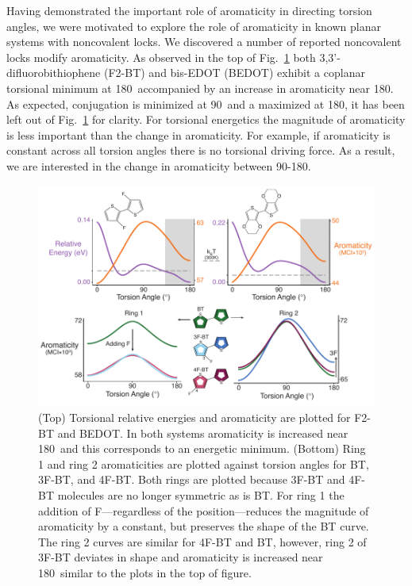 Having demonstrated the important role of aromaticity in directing torsion angles, we were motivated to explore the role of aromaticity in known planar systems with noncovalent locks. We discovered a number of reported noncovalent locks modify aromaticity. As observed in the top of Fig.~\ref{fig:a_mod} both  3,3'-difluorobithiophene (F2-BT) and bis-EDOT (BEDOT) exhibit a coplanar torsional minimum at 180\textdegree \ accompanied by an increase in aromaticity near 180\textdegree. As expected, conjugation is minimized at 90\textdegree \ and a maximized at 180\textdegree, it has been left out of Fig.~\ref{fig:a_mod} for clarity. For torsional energetics the magnitude of aromaticity is less important than the change in aromaticity. For example, if aromaticity is constant across all torsion angles there is no torsional driving force. As a result, we are interested in the change in aromaticity between 90-180\textdegree.

\begin{figure}[hbt!]
    \centering
    \includegraphics{figures/chap3/fig2_d7.pdf}
    \caption{(Top) Torsional relative energies and aromaticity are plotted for F2-BT and BEDOT. In both systems aromaticity is increased near 180\textdegree \ and this corresponds to an energetic minimum. (Bottom) Ring 1 and ring 2 aromaticities are plotted against torsion angles for BT, 3F-BT, and 4F-BT. Both rings are plotted because 3F-BT and 4F-BT molecules are no longer symmetric as is BT. For ring 1 the addition of F---regardless of the position---reduces the magnitude of aromaticity by a constant, but preserves the shape of the BT curve. The ring 2 curves are similar for 4F-BT and BT, however, ring 2 of 3F-BT deviates in shape and aromaticity is increased near 180\textdegree \ similar to the plots in the top of figure.}
    \label{fig:a_mod}
\end{figure}

